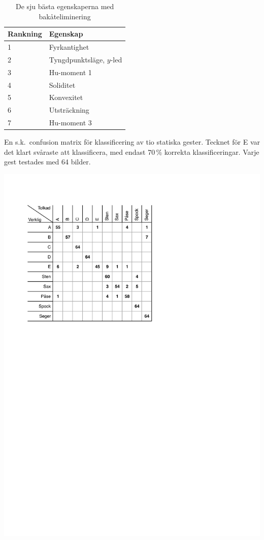 \documentclass[../rapport_MVEX01-11-05]{subfiles}
\begin{document}
\begin{table}[p]
	\centering
    \caption{De sju bästa egenskaperna med bakåteliminering}
       
	\label{tab:bestfeatsbwd}
	\begin{tabular}{ll}
		\toprule
		Rankning & Egenskap \\
		\midrule
                1 & Fyrkantighet \\
                2 & Tyngdpunktsläge, $y$-led \\
                3 & Hu-moment 1\\
                4 & Soliditet\\
                5 & Konvexitet \\
                6 & Utsträckning \\
                7 & Hu-moment 3 \\
		\bottomrule
	\end{tabular}
\end{table}

\clearpage

\begin{table}[p]
	  \centering
		\caption{En s.k.~confusion matrix för klassificering
                  av tio statiska gester. Tecknet för E var det klart
                  svåraste att klassificera, med endast 70\,\%
                  korrekta klassificeringar. Varje gest testades med
                  64 bilder.}
		\label{tab:tolkningsmatris}
    \includegraphics[trim=2cm 16cm 8.875cm
    2.5cm,clip=true,width=0.85\columnwidth]{bilder/tolkningsmatris.pdf}
\end{table}
\end{document}
